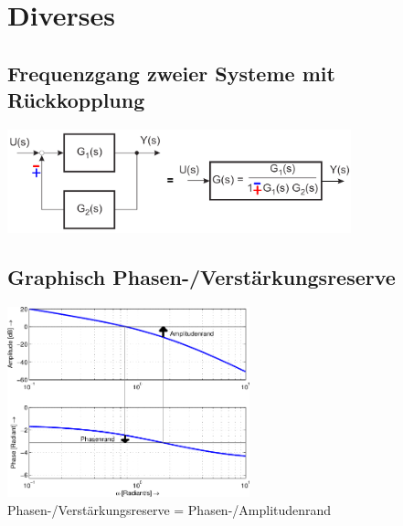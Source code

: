 \section{Diverses}
	\subsection{Frequenzgang zweier Systeme mit Rückkopplung }
			\begin{center}
        		\includegraphics[height=3cm]{./bilder/feedback.png}
        	\end{center}

	\subsection{Graphisch Phasen-/Verstärkungsreserve}
		\includegraphics[width=7cm]{./bilder/bode-stabilitaet.png} \\
		Phasen-/Verstärkungsreserve = Phasen-/Amplitudenrand
		